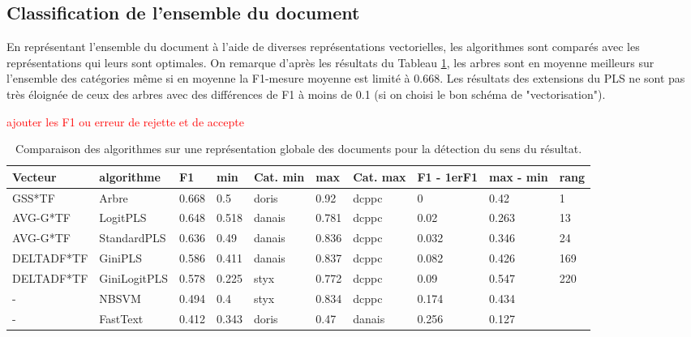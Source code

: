 \subsection{Classification de l'ensemble du document}

En représentant l'ensemble du document à l'aide de diverses représentations vectorielles, les algorithmes sont comparés avec les représentations qui leurs sont optimales. On remarque d'après les résultats du Tableau \ref{tab:sensrst:global}, les arbres sont en moyenne meilleurs sur l'ensemble des catégories même si en moyenne la F1-mesure moyenne est limité à 0.668. Les résultats des extensions du PLS ne sont pas très éloignée de ceux des arbres avec des différences de F1 à moins de 0.1 (si on choisi le bon schéma de "vectorisation").

\begin{table}[!htb]	
	\tiny
	
	\textcolor{red}{ajouter les F1 ou erreur de rejette et de accepte}
	
	\begin{tabular}{|l|l|l|l|l|l|l|l|l|l|}
		\hline
		\textbf{Vecteur} & \textbf{algorithme} & \textbf{F1} & \textbf{min} & \textbf{Cat. min} & \textbf{max} & \textbf{Cat. max} & \textbf{F1 - 1erF1} & \textbf{max - min} & \textbf{rang} \\ \hline
		GSS*TF           & Arbre               & 0.668       & 0.5          & doris             & 0.92         & dcppc             & 0                   & 0.42               & 1             \\ \hline
		AVG-G*TF         & LogitPLS            & 0.648       & 0.518        & danais            & 0.781        & dcppc             & 0.02                & 0.263              & 13            \\ \hline
		AVG-G*TF         & StandardPLS         & 0.636       & 0.49         & danais            & 0.836        & dcppc             & 0.032               & 0.346              & 24            \\ \hline
		DELTADF*TF       & GiniPLS             & 0.586       & 0.411        & danais            & 0.837        & dcppc             & 0.082               & 0.426              & 169           \\ \hline
		DELTADF*TF       & GiniLogitPLS        & 0.578       & 0.225        & styx              & 0.772        & dcppc             & 0.09                & 0.547              & 220           \\ \hline
		-                & NBSVM               & 0.494       & 0.4          & styx              & 0.834        & dcppc             & 0.174               & 0.434              &               \\ \hline
		-                & FastText            & 0.412       & 0.343        & doris             & 0.47         & danais            & 0.256               & 0.127              &               \\ \hline
	\end{tabular}
\caption{Comparaison des algorithmes sur une représentation globale des documents pour la détection du sens du résultat.}\label{tab:sensrst:global}
\end{table}


